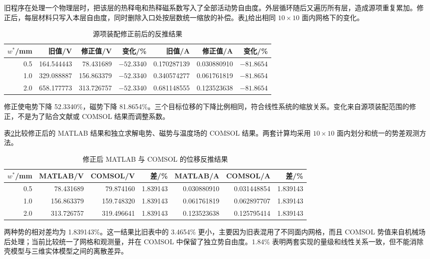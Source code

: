 \documentclass[UTF8,fontset=windows,11pt,a4paper]{ctexart}
\begin{document}
旧程序在处理一个物理层时，把该层的热释电和热释磁系数写入了全部活动势自由度。外层循环随后又遍历所有层，造成源项重复累加。修正后，每层材料只写入本层自由度，同时删除入口处按层数统一缩放的补偿。表\ref{tab:before-after}给出相同 $10\times10$ 面内网格下的变化。

\begin{table}[H]
\centering
\caption{源项装配修正前后的反推结果}
\label{tab:before-after}
\small
\begin{tabular}{rrrrrrr}
\toprule
$w^*$/mm & 旧值/V & 修正值/V & 变化/\% & 旧值/A & 修正值/A & 变化/\% \\
\midrule
0.5 & 164.544443 & 78.431689 & $-52.3340$ & 0.170287139 & 0.030880910 & $-81.8654$ \\
1.0 & 329.088887 & 156.863379 & $-52.3340$ & 0.340574277 & 0.061761819 & $-81.8654$ \\
2.0 & 658.177773 & 313.726757 & $-52.3340$ & 0.681148555 & 0.123523638 & $-81.8654$ \\
\bottomrule
\end{tabular}
\end{table}

修正使电势下降 52.3340\%，磁势下降 81.8654\%。三个目标位移的下降比例相同，符合线性系统的缩放关系。变化来自源项装配范围的修正，不是为了贴合文献或 COMSOL 结果而调整系数。

表\ref{tab:cross-solver}比较修正后的 MATLAB 结果和独立求解电势、磁势与温度场的 COMSOL 结果。两套计算均采用 $10\times10$ 面内划分和统一的势差观测方法。

\begin{table}[H]
\centering
\caption{修正后 MATLAB 与 COMSOL 的位移反推结果}
\label{tab:cross-solver}
\small
\setlength{\tabcolsep}{5pt}
\begin{tabular}{rrrrrrr}
\toprule
$w^*$/mm & MATLAB/V & COMSOL/V & 差/\% & MATLAB/A & COMSOL/A & 差/\% \\
\midrule
0.5 & 78.431689 & 79.874160 & 1.839143 & 0.030880910 & 0.031448854 & 1.839143 \\
1.0 & 156.863379 & 159.748320 & 1.839143 & 0.061761819 & 0.062897707 & 1.839143 \\
2.0 & 313.726757 & 319.496641 & 1.839143 & 0.123523638 & 0.125795414 & 1.839143 \\
\bottomrule
\end{tabular}
\end{table}

两种势的相对差均为 1.839143\%。这一结果比旧表中的 3.4654\% 更小，主要因为旧表混用了不同面内网格，而且 COMSOL 势值来自机械场后处理；当前比较统一了网格和观测量，并在 COMSOL 中保留了独立势自由度。1.84\% 表明两套实现的量级和线性关系一致，但不能消除壳模型与三维实体模型之间的离散差异。
\end{document}
